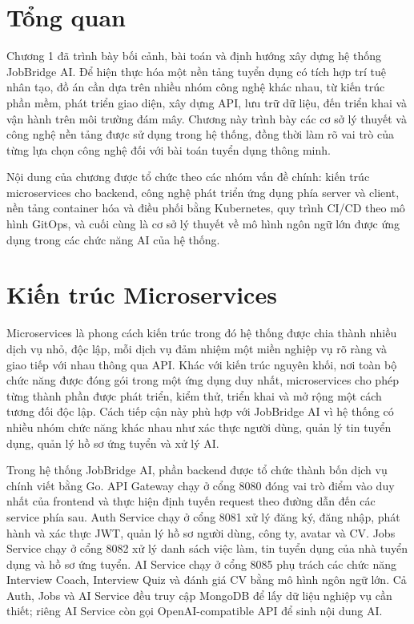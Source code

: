 \documentclass[../DoAn.tex]{subfiles}
\begin{document}
\label{chapter:2}

\section{Tổng quan}
Chương 1 đã trình bày bối cảnh, bài toán và định hướng xây dựng hệ thống JobBridge AI. Để hiện thực hóa một nền tảng tuyển dụng có tích hợp trí tuệ nhân tạo, đồ án cần dựa trên nhiều nhóm công nghệ khác nhau, từ kiến trúc phần mềm, phát triển giao diện, xây dựng API, lưu trữ dữ liệu, đến triển khai và vận hành trên môi trường đám mây. Chương này trình bày các cơ sở lý thuyết và công nghệ nền tảng được sử dụng trong hệ thống, đồng thời làm rõ vai trò của từng lựa chọn công nghệ đối với bài toán tuyển dụng thông minh.

Nội dung của chương được tổ chức theo các nhóm vấn đề chính: kiến trúc microservices cho backend, công nghệ phát triển ứng dụng phía server và client, nền tảng container hóa và điều phối bằng Kubernetes, quy trình CI/CD theo mô hình GitOps, và cuối cùng là cơ sở lý thuyết về mô hình ngôn ngữ lớn được ứng dụng trong các chức năng AI của hệ thống.

\section{Kiến trúc Microservices}
\label{section:2.1}
Microservices là phong cách kiến trúc trong đó hệ thống được chia thành nhiều dịch vụ nhỏ, độc lập, mỗi dịch vụ đảm nhiệm một miền nghiệp vụ rõ ràng và giao tiếp với nhau thông qua API. Khác với kiến trúc nguyên khối, nơi toàn bộ chức năng được đóng gói trong một ứng dụng duy nhất, microservices cho phép từng thành phần được phát triển, kiểm thử, triển khai và mở rộng một cách tương đối độc lập. Cách tiếp cận này phù hợp với JobBridge AI vì hệ thống có nhiều nhóm chức năng khác nhau như xác thực người dùng, quản lý tin tuyển dụng, quản lý hồ sơ ứng tuyển và xử lý AI.

Trong hệ thống JobBridge AI, phần backend được tổ chức thành bốn dịch vụ chính viết bằng Go. API Gateway chạy ở cổng 8080 đóng vai trò điểm vào duy nhất của frontend và thực hiện định tuyến request theo đường dẫn đến các service phía sau. Auth Service chạy ở cổng 8081 xử lý đăng ký, đăng nhập, phát hành và xác thực JWT, quản lý hồ sơ người dùng, công ty, avatar và CV. Jobs Service chạy ở cổng 8082 xử lý danh sách việc làm, tin tuyển dụng của nhà tuyển dụng và hồ sơ ứng tuyển. AI Service chạy ở cổng 8085 phụ trách các chức năng Interview Coach, Interview Quiz và đánh giá CV bằng mô hình ngôn ngữ lớn. Cả Auth, Jobs và AI Service đều truy cập MongoDB để lấy dữ liệu nghiệp vụ cần thiết; riêng AI Service còn gọi OpenAI-compatible API để sinh nội dung AI.
\end{document}

